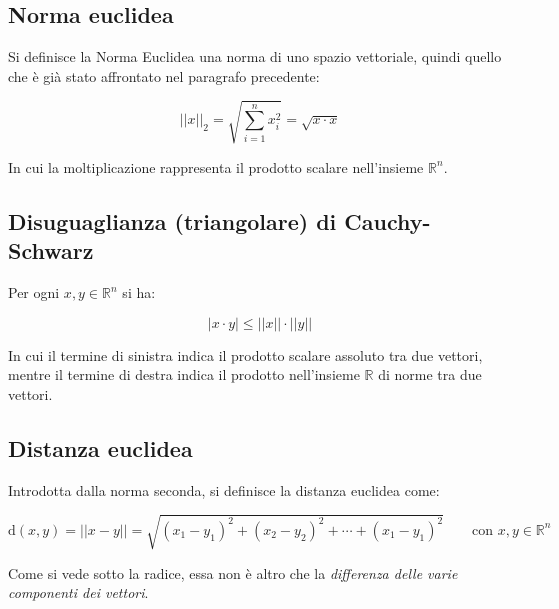 \documentclass[a4paper]{article}
\begin{document}
	\newpage
	
	\subsection{Norma euclidea}
	
	Si definisce la Norma Euclidea una norma di uno spazio vettoriale, quindi quello che è già stato affrontato nel paragrafo precedente:
	
	\begin{equation}\label{Norma euclidea}
		\Big||x|\Big|_{2} = \sqrt{\sum_{i = 1}^{n} x_{i}^{2}} = \sqrt{x \cdot x}
	\end{equation}
	
	\noindent
	In cui la moltiplicazione rappresenta il prodotto scalare nell'insieme $\mathbb{R}^{n}$.
	
	\subsection{Disuguaglianza (triangolare) di Cauchy-Schwarz}
	
	Per ogni $x, y \in \mathbb{R}^{n}$ si ha:
	
	\begin{equation}\label{disuguaglianza triangolare di cauchy-schwarz}
		|x \cdot y| \le \Big||x|\Big| \cdot \Big||y|\Big|
	\end{equation}

	\noindent
	In cui il termine di sinistra indica il prodotto scalare assoluto tra due vettori, mentre il termine di destra indica il prodotto nell'insieme $\mathbb{R}$ di norme tra due vettori.
	
	\subsection{Distanza euclidea}
	
	Introdotta dalla norma seconda, si definisce la distanza euclidea come:
	
	\begin{equation}\label{distanza euclidea}
		\mathrm{d}\left(x,y\right) = \Big||x-y|\Big| = \sqrt{\left(x_{1}-y_{1}\right)^{2} + \left(x_{2}-y_{2}\right)^{2} + \cdots + \left(x_{1}-y_{1}\right)^{2}} \hspace{2em} \text{con } x,y\in\mathbb{R}^{n}
	\end{equation}

	\noindent
	Come si vede sotto la radice, essa non è altro che la \emph{differenza delle varie componenti dei vettori}.
\end{document}
